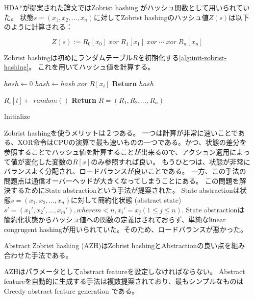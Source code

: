 \documentclass{report}
\begin{document}
HDA*が提案された論文\cite{kishimotofb13}ではZobrist hashing \cite{zobrist:70}がハッシュ関数として用いられていた。
状態$s = (x_1,x_2,...,x_n)$に対してZobrist hashingのハッシュ値$Z(s)$は以下のように計算される：

\begin{equation}
\label{eq:zobrist}
 	Z(s) := R_{0}[x_{0}]\; xor\; R_{1}[x_{1}]\; xor\; \cdots\; xor\; R_{n}[x_{n}]%
\end{equation}

Zobrist hashingは初めにランダムテーブル$R$を初期化する\ref{alg:init-zobrist-hashing}。
これを用いてハッシュ値を計算する。

\begin{algorithm}
	$hash \leftarrow 0$\;
	 {
		$hash \leftarrow hash \; xor \; R[x_i]$\;
	}
	{\bf Return} $hash$\;
	\caption{\ZHDA{}}
	\label{alg:zobrist-hashing}
\end{algorithm}

\begin{algorithm}
	 {
		 {
			$R_i[t] \leftarrow random()$\;
		}
	}
	{\bf Return} $R = (R_1, R_2,...,R_n)$
	\caption{Initialize \ZHDA{}}
	\label{alg:init-zobrist-hashing}
\end{algorithm}


Zobrist hashingを使うメリットは２つある。
一つは計算が非常に速いことである、XOR命令はCPUの演算で最も速いものの一つである。かつ、状態の差分を参照することでハッシュ値を計算することが出来るので、アクション適用によって値が変化した変数の$R[x]$のみ参照すれば良い。
もうひとつは、状態が非常にバランスよく分配され、ロードバランスが良いことである。
一方、この手法の問題点は通信オーバーヘッドが大きくなってしまうことにある。
この問題を解決するためにState abstractionという手法が提案された\cite{burnslrz10}。
State abstractionは状態$s = (x_1,x_2,...,x_n)$に対して簡約化状態 (abstract state) $s' = (x_1',x_2',...,x_m'), where m < n, x_i' = x_j (1 \leq j \leq n)$. %
State abstractionは簡約化状態からハッシュ値への関数の定義はされておらず、単純なlinear congrugent hashingが用いられていた。そのため、ロードバランスが悪かった。

Abstract Zobrist hashing (AZH)はZobrist hashingとAbstractionの良い点を組み合わせた手法である\cite{jinnai2016structured}。

AZHはパラメータとしてabstract featureを設定しなければならない。
Abstract featureを自動的に生成する手法は複数提案されており、最もシンプルなものはGreedy abstract feature generation \cite{jinnai2016automated}である。
\end{document}
